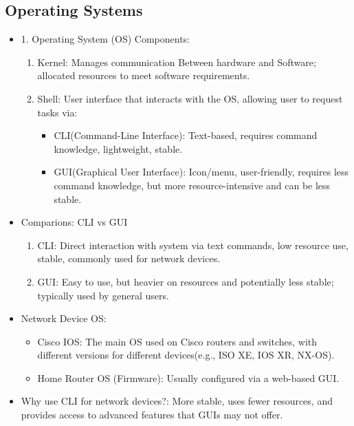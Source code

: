 \documentclass[a4paper,11pt]{article}
\begin{document}
\subsection{Operating Systems}
\begin{itemize}
    \item 1. Operating System (OS) Components:\\
    \begin{enumerate}
        \item Kernel: Manages communication Between hardware and Software; allocated resources to meet software requirements.\\
        \item Shell: User interface that interacts with the OS, allowing user to request tasks via:\\
        \begin{itemize}
            \item CLI(Command-Line Interface): Text-based, requires command knowledge, lightweight, stable.\\
            \item GUI(Graphical User Interface): Icon/menu, user-friendly, requires less command knowledge, but more resource-intensive and can be less stable.\\
        \end{itemize}
    \end{enumerate}
    \item Comparions: CLI vs GUI\\
    \begin{enumerate}
        \item CLI: Direct interaction with system via text commands, low resource use, stable, commonly used for network devices.\\
        \item GUI: Easy to use, but heavier on resources and potentially less stable; typically used by general users.\\
    \end{enumerate}
    \item Network Device OS:\\
    \begin{itemize}
        \item Cisco IOS: The main OS  used on Cisco routers and switches, with different versions for different devices(e.g., ISO XE, IOS XR, NX-OS).\\
        \item Home Router OS (Firmware): Usually configured via a web-based GUI.\\
    \end{itemize}
    \item Why use CLI  for network devices?: More stable, uses fewer resources, and provides access to advanced features that GUIs may not offer.\\
\end{itemize}
\end{document}
